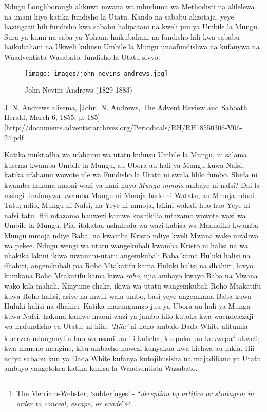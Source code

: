 Ndugu Loughborough alikuwa mwana wa mhudumu wa Methodisti na alilelewa na imani hiyo katika fundisho la Utatu. Kando na sababu alizotaja, yeye hazingatii hili fundisho kwa sababu halipatani na kweli juu ya Umbile la Mungu. Sura ya kumi na saba ya Yohana haikubaliani na fundisho hili kwa sababu haikubaliani na Ukweli kuhusu Umbile la Mungu unaofundishwa na kufanywa na Waadventista Wasabato; fundisho la Utatu sivyo.


\begin{figure}[hp]
    \centering
    \texttt{[image: images/john-nevins-andrews.jpg]}
    \caption*{John Nevins Andrews (1829-1883)}
    \label{fig:j-n-andrews}
\end{figure}



J. N. Andrews alisema, [John. N. Andrews, The Advent Review and Sabbath Herald, March 6, 1855, p. 185][http://documents.adventistarchives.org/Periodicals/RH/RH18550306-V06-24.pdf]


Katika muktadha wa ufahamu wa utatu kuhusu Umbile la Mungu, ni salama kusema kwamba Umbile la Mungu, au Ubora au hali ya Mungu kuwa Nafsi, katika ufahamu wowote ule wa Fundisho la Utatu ni swala lililo fumbo. Shida ni kwamba hakuna maoni wazi ya nani huyo \textit{Mungu mmoja} ambaye ni nafsi? Dai la msingi linafanywa kwamba Mungu ni Mmoja bado ni Watatu, au Mmoja ndani Tatu; ndio, Mungu ni Nafsi, na Yeye ni mmoja, lakini wakati huo huo Yeye ni nafsi tatu. Hii mtazamo hauwezi kamwe kushikilia mtazamo wowote wazi wa Umbile la Mungu. Pia, itakataa ushuhuda wa wazi kabisa wa Maandiko kwamba Mungu mmoja ndiye Baba, na kwamba Kristo ndiye kweli Mwana wake mzaliwa wa pekee. Ndugu wengi wa utatu wangekubali kwamba Kristo ni halisi na wa uhakika lakini ikiwa mwamini-utatu angemkubali Baba kama Huluki halisi na dhahiri, angemkubali pia Roho Mtakatifu kama Huluki halisi na dhahiri, hivyo kumkana Roho Mtakatifu kama kuwa \textit{roho}, njia ambayo kwayo Baba na Mwana wako kila mahali. Kinyume chake, ikiwa wa utatu wangemkubali Roho Mtakatifu kuwa Roho halisi, asiye na mwili wala umbo, basi yeye angemkana Baba kuwa Huluki halisi na dhahiri. Katika mazungumzo juu ya Ubora au hali ya Mungu kuwa Nafsi, hakuna kamwe maoni wazi ya jambo hilo kutoka kwa waendelezaji wa mafundisho ya Utatu; ni hila. \textit{‘Hila’} ni neno ambalo Dada White alitumia kuelezea udanganyifu huo wa usanii au ili kuficha, kuepuka, au kukwepa\footnote{\href{https://www.merriam-webster.com/dictionary/subterfuges}{The Merriam-Webster, ‘subterfuges’} - “\textit{deception by artifice or stratagem in order to conceal, escape, or evade}”} ukweli; kwa maneno mengine, kitu ambacho huwezi kunyakua kwa kichwa au mkia. Hii ndiyo sababu kuu ya Dada White kufanya kutojihusisha na majadiliano ya Utatu ambayo yangetokea katika kanisa la Waadventista Wasabato.


